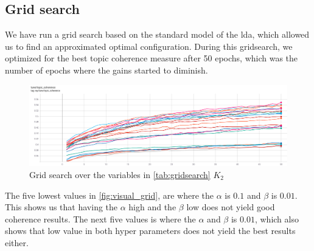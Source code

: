 \subsection{Grid search}
We have run a grid search based on the standard model of the \gls{lda}, which allowed us to find an approximated optimal configuration.
During this gridsearch, we optimized for the best topic coherence measure after 50 epochs, which was the number of epochs where the gains started to diminish.
\begin{figure}
	\includegraphics[width=\textwidth]{figures/gridsearch.png}
	\caption{Grid search over the variables in \autoref{tab:gridsearch} $K_2$}
	\label{fig:visual_grid}
\end{figure} 
The five lowest values in \autoref{fig:visual_grid}, are where the $\alpha$ is $0.1$ and $\beta$ is $0.01$. 
This shows us that having the $\alpha$ high and the $\beta$ low does not yield good coherence results.
The next five values is where the $\alpha$ and $\beta$ is $0.01$, which also shows that low value in both hyper parameters does not yield the best results either.